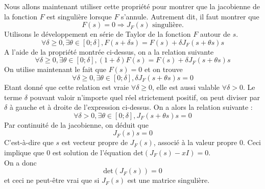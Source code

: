 Nous allons maintenant utiliser cette propriété pour montrer que la jacobienne de la fonction $F$ est singulière lorsque $F$ s'annule. Autrement dit, il faut montrer que $$F(s) = 0 \Rightarrow J_{F}(s) \text{ singulière}.$$
Utilisons le développement en série de Taylor de la fonction $F$ autour de $s$.\\
$$\forall \delta \geq 0, \exists \theta \in [0;\delta], F(s+\delta s) = F(s) + \delta J_F(s+\theta s)s$$
A l'aide de la propriété montrée ci-dessus, on a la relation suivante  $$\forall \delta \geq 0, \exists \theta \in [0;\delta], (1+\delta)F(s) = F(s) + \delta J_F(s+\theta s)s$$
On utilise maintenant le fait que $F(s) = 0$ et on trouve $$\forall \delta \geq 0, \exists \theta \in [0;\delta], \delta J_F(s+\theta s)s = 0$$
Etant donné que cette relation est vraie $\forall \delta \geq 0$, elle est aussi valable $\forall \delta > 0$. Le terme $\delta$ pouvant valoir n'importe quel réel strictement positif, on peut diviser par $\delta$ à gauche et à droite de l'expression ci-dessus. On a alors la relation suivante : $$\forall \delta > 0, \exists \theta \in [0;\delta], J_F(s+\theta s)s = 0$$
Par continuité de la jacobienne, on déduit que $$J_F(s)s = 0$$
C'est-à-dire que $s$ est vecteur propre de $J_F(s)$, associé à la valeur propre $0$. Ceci implique que $0$ est solution de l'équation $\text{det}(J_F(s)-xI)=0$.\\
On a donc $$\text{det}(J_F(s))=0$$ et ceci ne peut-être vrai que si $J_F(s)$ est une matrice singulière.

